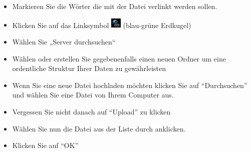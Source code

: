 \documentclass[article, a4paper, oneside, 11pt]{memoir}
\begin{document}
\begin{itemize}
\item Markieren Sie die Wörter die mit der Datei verlinkt werden sollen.
\item Klicken Sie auf das Linksymbol \includegraphics[height=5mm]{link_icon} (blau-grüne Erdkugel)
\item Wählen Sie „Server durchsuchen“
\item Wählen oder erstellen Sie gegebenenfalls einen neuen Ordner um eine ordentliche Struktur Ihrer Daten zu gewährleisten
\item Wenn Sie eine neue Datei hochladen möchten klicken Sie auf "`Durchsuchen"' und wählen Sie eine Datei von Ihrem Computer aus.
\item Vergessen Sie nicht danach auf "`Upload"' zu klicken
\item Wählen Sie nun die Datei aus der Liste durch anklicken.
\item Klicken Sie auf "`OK"'
\end{itemize}
\end{document}
